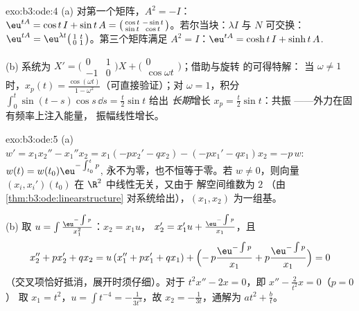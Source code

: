\begin{solution}{exo:b3:ode:4}
(a) 对第一个矩阵，$A^2 = -I$：$\eu^{tA} = \cos t\,I + \sin
t\,A = \bigl(\begin{smallmatrix}\cos t & -\sin t\\ \sin t &
\cos t\end{smallmatrix}\bigr)$。若尔当块：$\lambda I$ 与
$N$ 可交换：$\eu^{tA} =
\eu^{\lambda t}\bigl(\begin{smallmatrix}1 & t\\ 0 &
1\end{smallmatrix}\bigr)$。第三个矩阵满足 $A^2 = I$：$\eu^{tA} =
\cosh t\,I + \sinh t\,A$.

(b) 系统为 $X' = \bigl(\begin{smallmatrix}0&1\\-1&0
\end{smallmatrix}\bigr)X + \bigl(\begin{smallmatrix}0\\
\cos\omega t\end{smallmatrix}\bigr)$；借助与旋转
的可得特解：
当 $\omega \neq 1$ 时，$x_p(t) = \frac{\cos(\omega t)}{1 -
\omega^2}$（可直接验证）；对 $\omega = 1$，积分
$\int_0^t\sin(t - s)\cos s\,\dd s = \frac t2\sin t$ 给出
\emph{长期}增长 $x_p = \frac t2\sin t$：共振
——外力在固有频率上注入能量，
振幅线性增长。
\end{solution}

\begin{solution}{exo:b3:ode:5}
(a) $w' = x_1x_2'' - x_1''x_2 = x_1(-px_2' - qx_2) - (-px_1'
- qx_1)x_2 = -p\,w$: $w(t) = w(t_0)\eu^{-\int_{t_0}^tp}$,
永不为零，也不恒等于零。若 $w \neq 0$，则向量
$(x_i, x_i')(t_0)$ 在 $\R^2$ 中线性无关，又由于
解空间维数为 $2$
（由 \cref{thm:b3:ode:linearstructure} 对系统给出），$(x_1,
x_2)$ 为一组基。

(b) 取 $u = \int\frac{\eu^{-\int p}}{x_1^2}$：$x_2 = x_1u$，
$x_2' = x_1'u + \frac{\eu^{-\int p}}{x_1}$，且
\[
x_2'' + px_2' + qx_2
= u\,(x_1'' + px_1' + qx_1) +
\Bigl(-\,p\frac{\eu^{-\int p}}{x_1} +
p\frac{\eu^{-\int p}}{x_1}\Bigr) = 0
\]
（交叉项恰好抵消，展开时须仔细）。对于
$t^2x'' - 2x = 0$，即 $x'' - \frac2{t^2}x = 0$（$p = 0$）
取 $x_1 = t^2$，$u = \int t^{-4} = -\frac1{3t^3}$，故 $x_2
= -\frac1{3t}$，通解为 $at^2 + \frac bt$。
\end{solution}

